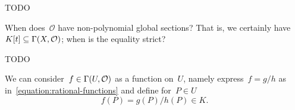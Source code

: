 \documentclass[a4paper,11pt,oneside,openany,article]{memoir}
\begin{document}
\begin{enumerate}
    \begin{solution}
      TODO
    \end{solution}

    When does~$\mathcal{O}$ have non-polynomial global sections? That is, we certainly have~$K[t]\subseteq\mathrm{\Gamma}(X,\mathcal{O})$; when is the equality strict?

    \begin{solution}
      TODO
    \end{solution}

    We can consider~$f\in\mathrm{\Gamma}(U,\mathcal{O})$ as a function on~$U$, namely express~$f=g/h$ as in~\eqref{equation:rational-functions} and define for~$P\in U$
    \begin{equation}
      f(P)=g(P)/h(P)\in K.
    \end{equation}
\end{enumerate}

\clearpage
\end{document}
